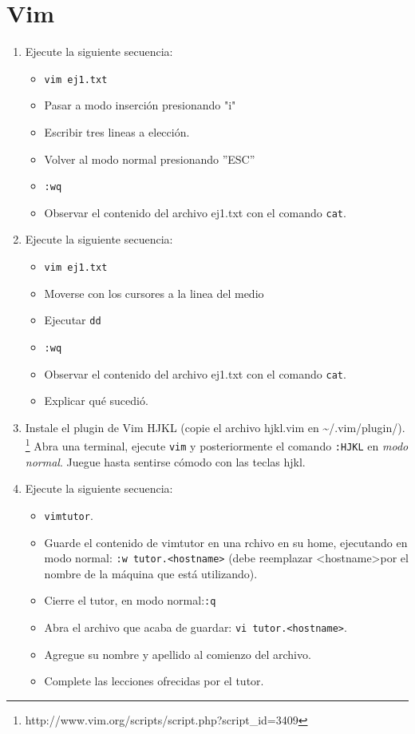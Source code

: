 \documentclass[12pt]{article}
\begin{document}
\section*{Vim}
\begin{enumerate}
\item Ejecute la siguiente secuencia:
	\begin{itemize}
	\item \texttt{vim ej1.txt}
        \item Pasar a modo inserción presionando "i"
        \item Escribir tres lineas a elección. 
        \item Volver al modo normal presionando ''ESC''
        \item \texttt{:wq}
	\item Observar el contenido del archivo ej1.txt con el comando \texttt{cat}. 
	\end{itemize}
\item Ejecute la siguiente secuencia:
	\begin{itemize}
        \item \texttt{vim ej1.txt}
        \item Moverse con los cursores a la linea del medio
        \item Ejecutar \texttt{dd}
        \item \texttt{:wq}
	\item Observar el contenido del archivo ej1.txt con el comando \texttt{cat}. 
        \item Explicar qué sucedió. 
	\end{itemize}
\item Instale el plugin de Vim HJKL (copie el archivo hjkl.vim en \textasciitilde/.vim/plugin/). 
 \footnote{http://www.vim.org/scripts/script.php?script\_id=3409}
Abra una terminal, ejecute \texttt{vim} y posteriormente el comando \texttt{:HJKL} en \textit{modo normal}. 
Juegue hasta sentirse cómodo con las teclas hjkl. 
\item Ejecute la siguiente secuencia:
	\begin{itemize}
	\item \texttt{vimtutor}. 
	\item Guarde el contenido de vimtutor en una rchivo en su home, ejecutando en modo normal: \texttt{:w tutor.\textless hostname\textgreater} (debe reemplazar \textless hostname\textgreater por el nombre de la máquina que está utilizando).
	\item Cierre el tutor, en modo normal:\texttt{:q}
	\item Abra el archivo que acaba de guardar: \texttt{vi tutor.\textless hostname\textgreater}.  
	\item Agregue su nombre y apellido al comienzo del archivo.
	\item Complete las lecciones ofrecidas por el tutor. 
	\end{itemize}
\end{enumerate}
\end{document}
